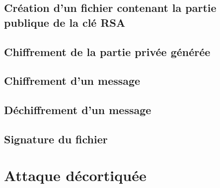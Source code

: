 \documentclass[11pt]{article}
\begin{document}
\subsection{Création d'un fichier contenant la partie publique de la clé RSA}
\subsection{Chiffrement de la partie privée générée}
\subsection{Chiffrement d'un message}
\subsection{Déchiffrement d'un message}
\subsection{Signature du fichier}
\section{Attaque décortiquée}
\end{document}
